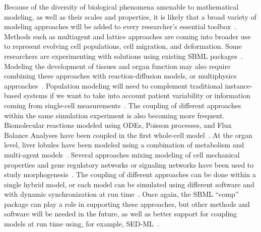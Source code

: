 \documentclass{sbml-paper}
\begin{document}
Because of the diversity of biological phenomena amenable to mathematical modeling, as well as their scales and properties, it is likely that a broad variety of modeling approaches will be added to every researcher's essential toolbox~\citep{Cvijovic2014bridging}.  Methods such as multiagent and lattice approaches are coming into broader use to represent evolving cell populations, cell migration, and deformation.  Some researchers are experimenting with solutions using existing SBML packages~\citep{watanabe2016efficient, varela2018epilog}.  Modeling the development of tissues and organ function may also require combining these approaches with reaction-diffusion models, or multiphysics approaches~\citep{Nickerson2016human}.  Population modeling will need to complement traditional instance-based systems if we want to take into account patient variability or information coming from single-cell measurements~\citep{Levin1997mathematical}.  The coupling of different approaches within the same simulation experiment is also becoming more frequent.  Biomolecular reactions modeled using ODEs, Poisson processes, and Flux Balance Analyses have been coupled in the first whole-cell model~\citep{Karr2015principles}.  At the organ level, liver lobules have been modeled using a combination of metabolism and multi-agent models~\citep{schliess2014integrated}.  Several approaches mixing modeling of cell mechanical properties and gene regulatory networks or signaling networks have been used to study morphogenesis~\citep[e.g.,][]{tanaka2015lbibcell}.  The coupling of different approaches can be done within a single hybrid model, or each model can be simulated using different software and with dynamic synchronization at run time~\citep{mattioni2013integration}.  Once again, the SBML ``comp'' package can play a role in supporting these approaches, but other methods and software will be needed in the future, as well as better support for coupling models at run time using, for example, SED-ML~\citep{waltemath2011reproducible}.
\end{document}
